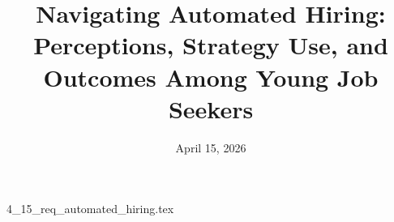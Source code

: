 \documentclass{article}      %
\title{Navigating Automated Hiring: Perceptions, Strategy Use, and Outcomes Among Young Job Seekers}  %
\date{April 15, 2026}
\begin{document}

\maketitle                   %

{4_15_req_automated_hiring.tex}
\printbibliography
\end{document}
